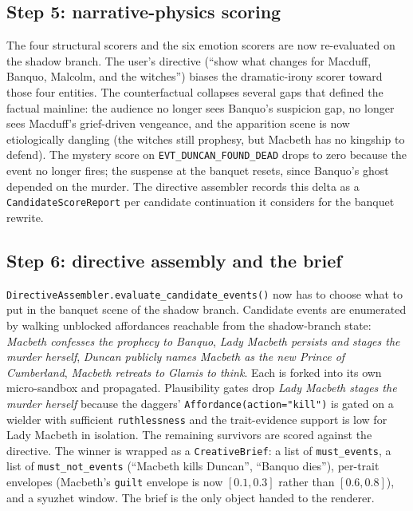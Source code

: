 \documentclass[11pt]{article}
\begin{document}
\subsection{Step 5: narrative-physics scoring}
\label{app:wk-narrative}

The four structural scorers and the six emotion scorers are now
re-evaluated on the shadow branch. The user's directive (``show
what changes for Macduff, Banquo, Malcolm, and the witches'')
biases the dramatic-irony scorer toward those four entities. The
counterfactual collapses several gaps that defined the factual
mainline: the audience no longer sees Banquo's suspicion gap, no
longer sees Macduff's grief-driven vengeance, and the apparition
scene is now etiologically dangling (the witches still prophesy,
but Macbeth has no kingship to defend). The mystery score on
\texttt{EVT\_DUNCAN\_FOUND\_DEAD} drops to zero because the event
no longer fires; the suspense at the banquet resets, since
Banquo's ghost depended on the murder. The directive assembler
records this delta as a \texttt{CandidateScoreReport} per
candidate continuation it considers for the banquet rewrite.

\subsection{Step 6: directive assembly and the brief}
\label{app:wk-brief}

\texttt{DirectiveAssembler.evaluate\_candidate\_events()} now has
to choose what to put in the banquet scene of the shadow branch.
Candidate events are enumerated by walking unblocked affordances
reachable from the shadow-branch state: \emph{Macbeth confesses
the prophecy to Banquo}, \emph{Lady Macbeth persists and stages
the murder herself}, \emph{Duncan publicly names Macbeth as the
new Prince of Cumberland}, \emph{Macbeth retreats to Glamis to
think}. Each is forked into its own micro-sandbox and propagated.
Plausibility gates drop \emph{Lady Macbeth stages the murder
herself} because the daggers' \texttt{Affordance(action="kill")}
is gated on a wielder with sufficient \texttt{ruthlessness} and
the trait-evidence support is low for Lady Macbeth in isolation.
The remaining survivors are scored against the directive. The
winner is wrapped as a \texttt{CreativeBrief}: a list of
\texttt{must\_events}, a list of \texttt{must\_not\_events}
(``Macbeth kills Duncan'', ``Banquo dies''), per-trait envelopes
(Macbeth's \texttt{guilt} envelope is now $[0.1, 0.3]$ rather than
$[0.6, 0.8]$), and a syuzhet window. The brief is the only object
handed to the renderer.
\end{document}
